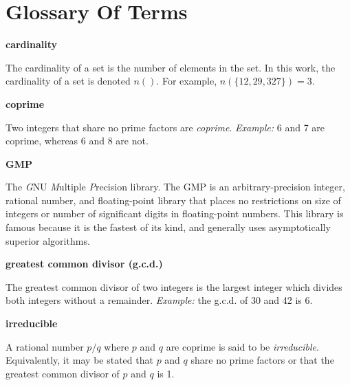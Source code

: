 
\chapter{Glossary Of Terms}

\label{cglo0}

\begin{vworktermglossaryenum}


\item \textbf{cardinality}

      The cardinality of a set is the
      number of elements in the set.  In this work, the cardinality
      of a set is denoted $n()$.  For example, 
      $n(\{12,29,327\}) = 3$.

\item \textbf{coprime}

      Two integers that share no prime factors are \emph{coprime}.
      \emph{Example:}
      6 and 7 are coprime, whereas 6 and 8 are not.

\item \textbf{GMP}

      The \emph{G}NU \emph{M}ultiple \emph{P}recision library.
      The GMP is an arbitrary-precision integer, rational number,
      and floating-point library that places no restrictions on
      size of integers or number of significant digits in floating-point
      numbers.  This 
      library is famous because it is the fastest of its
      kind, and generally uses asymptotically superior algorithms.

\item \textbf{greatest common divisor (g.c.d.)}

      The greatest common divisor of two integers is the largest
      integer which divides both integers without a remainder.
      \emph{Example:} the g.c.d. of 30 and 42 is 6.

\item \textbf{irreducible}

      A rational number $p/q$ where $p$ and $q$ are coprime
      is said to be \emph{irreducible}.
      Equivalently, it may be stated that $p$ and $q$ share no prime factors
      or that the greatest common divisor of
      $p$ and $q$ is 1.


\end{vworktermglossaryenum}

